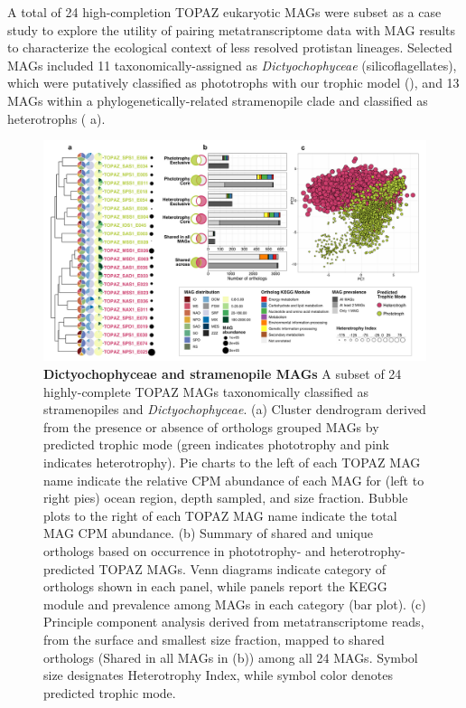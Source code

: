 \documentclass[12pt]{article}
\numberwithin{equation}{section}
\begin{document}
A total of 24 high-completion TOPAZ eukaryotic MAGs were subset as a case study to explore the utility of pairing metatranscriptome data with MAG results to characterize the ecological context of less resolved protistan lineages. Selected MAGs included 11 taxonomically-assigned as \textit{Dictyochophyceae} (silicoflagellates), which were putatively classified as phototrophs with our trophic model (), and 13 MAGs within a phylogenetically-related stramenopile clade and classified as heterotrophs ( a). 


\begin{figure}[h!]    
    \centering
    \includegraphics[width = \columnwidth]{figures/Figure5-panel-plot-stramenopile-H.png}
    \caption{ \textbf{Dictyochophyceae and stramenopile MAGs} A subset of 24 highly-complete TOPAZ MAGs taxonomically classified as stramenopiles and \textit{Dictyochophyceae}. (a) Cluster dendrogram derived from the presence or absence of orthologs grouped MAGs by predicted trophic mode (green indicates phototrophy and pink indicates heterotrophy). Pie charts to the left of each TOPAZ MAG name indicate the relative CPM abundance of each MAG for (left to right pies) ocean region, depth sampled, and size fraction. Bubble plots to the right of each TOPAZ MAG name indicate the total MAG CPM abundance. (b) Summary of shared and unique orthologs based on occurrence in phototrophy- and heterotrophy-predicted TOPAZ MAGs. Venn diagrams indicate category of orthologs shown in each panel, while panels report the KEGG module and prevalence among MAGs in each category (bar plot). (c) Principle component analysis derived from metatranscriptome reads, from the surface and smallest size fraction, mapped to shared orthologs (Shared in all MAGs in (b)) among all 24 MAGs. Symbol size designates Heterotrophy Index, while symbol color denotes predicted trophic mode. 
    }
    \label{fig:fig5-dicty}
\end{figure}
\end{document}
